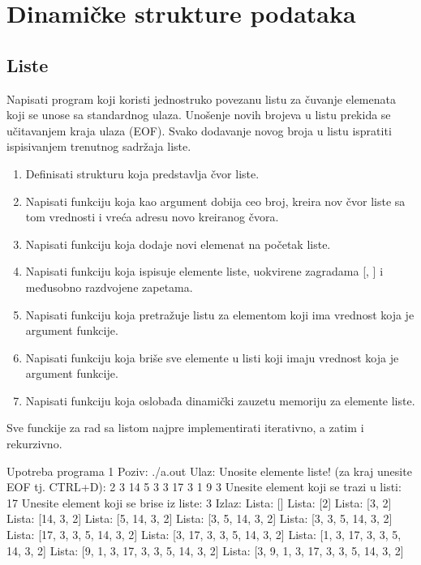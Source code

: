 
\chapter{Dinamičke strukture podataka}

\section{Liste}

\begin{Exercise}[label=601]
Napisati program koji koristi jednostruko povezanu listu za čuvanje elemenata koji se unose sa standardnog ulaza. 
Unošenje novih brojeva u listu prekida se učitavanjem kraja ulaza (EOF). 
Svako dodavanje novog broja u listu ispratiti ispisivanjem trenutnog sadržaja liste. 
\begin{enumerate}
\item Definisati strukturu  koja predstavlja čvor liste.
\item Napisati funkciju koja kao argument dobija ceo broj, kreira nov čvor liste sa tom vrednosti i vreća adresu novo kreiranog čvora.
 \item Napisati funkciju koja dodaje novi elemenat na početak liste. 
 \item Napisati funkciju koja ispisuje elemente liste, uokvirene zagradama [, ] i međusobno razdvojene zapetama.
 \item Napisati funkciju koja pretražuje listu za elementom koji ima vrednost koja je argument funkcije.
 \item Napisati funkciju koja briše sve elemente u listi koji imaju vrednost koja je argument funkcije.
 \item Napisati funkciju koja oslobađa dinamički zauzetu memoriju za elemente liste.
 \end{enumerate}

Sve funckije za rad sa listom najpre implementirati iterativno, a zatim i rekurzivno.


\begin{maxitest}
\begin{test}{Upotreba programa 1}
Poziv: ./a.out
Ulaz:
	Unosite elemente liste! (za kraj unesite EOF tj. CTRL+D): 2 3 14 5 3 3 17 3 1 9 3
	Unesite element koji se trazi u listi: 17
	Unesite element koji se brise iz liste: 3
Izlaz:
        Lista: []
        Lista: [2]
        Lista: [3, 2]
        Lista: [14, 3, 2]
        Lista: [5, 14, 3, 2]
        Lista: [3, 5, 14, 3, 2]
        Lista: [3, 3, 5, 14, 3, 2]
        Lista: [17, 3, 3, 5, 14, 3, 2]
        Lista: [3, 17, 3, 3, 5, 14, 3, 2]
        Lista: [1, 3, 17, 3, 3, 5, 14, 3, 2]
        Lista: [9, 1, 3, 17, 3, 3, 5, 14, 3, 2]
        Lista: [3, 9, 1, 3, 17, 3, 3, 5, 14, 3, 2]


\end{test}
\end{maxitest}
\end{Exercise}
